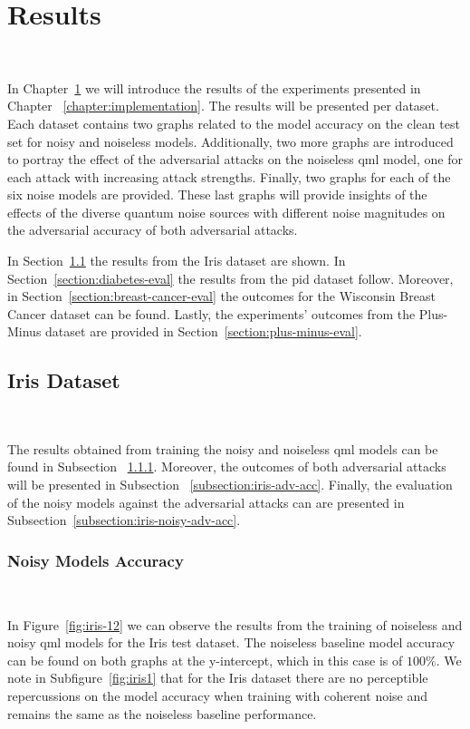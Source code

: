 \chapter{Results}\label{chapter:results} \

In Chapter~\ref{chapter:results} we will introduce
the results of the experiments presented in Chapter
~\ref{chapter:implementation}. The results will be presented
per dataset. Each dataset contains two graphs related to
the model accuracy on the clean test set for noisy and
noiseless models. Additionally, two more graphs are
introduced to portray the effect of the adversarial
attacks on the noiseless \ac{qml} model, one for each
attack with increasing attack strengths. Finally, two
graphs for each of the six noise models are provided.
These last graphs will provide insights of the effects
of the diverse quantum noise sources with different noise 
magnitudes on the adversarial accuracy of both adversarial
attacks. \

In Section~\ref{section:iris-eval} the results from
the Iris dataset are shown. In Section~\ref{section:diabetes-eval}
the results from the \ac{pid} dataset follow. Moreover,
in Section~\ref{section:breast-cancer-eval} the outcomes
for the Wisconsin Breast Cancer dataset can be found.
Lastly, the experiments' outcomes from the Plus-Minus dataset
are provided in Section~\ref{section:plus-minus-eval}. \

\section{Iris Dataset}\label{section:iris-eval} \

The results obtained from training the noisy and noiseless
\ac{qml} models can be found in Subsection
~\ref{subsection:iris-noisy-acc}. Moreover, the outcomes
of both adversarial attacks will be presented in Subsection
~\ref{subsection:iris-adv-acc}. Finally, the evaluation
of the noisy models against the adversarial attacks can
are presented in Subsection~\ref{subsection:iris-noisy-adv-acc}. \

\subsection{Noisy Models Accuracy}\label{subsection:iris-noisy-acc} \

In Figure~\ref{fig:iris-12} we can observe the results
from the training of noiseless and noisy \ac{qml} models
for the Iris test dataset. The noiseless baseline model accuracy
can be found on both graphs at the y-intercept, which in
this case is of \(100\%\). We note in Subfigure~\ref{fig:iris1}
that for the Iris dataset there are no perceptible
repercussions on the model accuracy when training with
coherent noise and remains the same as the noiseless
baseline performance. \

